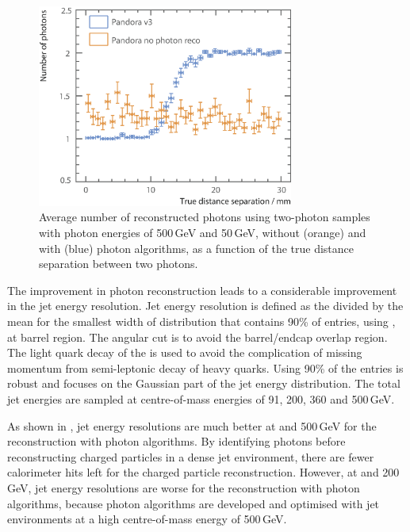 \begin{figure}[!tbph]
\centering
\includegraphics[width=0.75\textwidth]{photon/nPhotonVSnoPhotonReco3}
\caption[Average number of photons using two photons of 500 and 50\,GeV per event sample.]
{Average number of reconstructed  photons using two-photon samples with photon energies of  500\,GeV and 50\,GeV, without (orange) and with (blue) photon algorithms, as a function of the true distance separation between two photons.}
\label{fig:photonDoublePerformanceNoReco}
\end{figure}




The improvement in photon reconstruction leads to a considerable improvement in the jet energy resolution. Jet energy resolution is defined as the \rms divided by the mean for the smallest width of distribution that contains 90\% of entries, using \eeZuds, at barrel region. The angular cut is to avoid the barrel/endcap overlap region. The light quark decay of the \Zprime is used   to avoid the complication of missing momentum from semi-leptonic decay of heavy quarks. Using 90\% of the entries is robust and focuses on the Gaussian part of the jet energy distribution. The total jet energies are   sampled at centre-of-mass energies of 91, 200, 360 and 500\,GeV.

As shown in , jet energy resolutions are much better at  and 500\,GeV for the reconstruction with photon algorithms. By identifying photons before reconstructing charged particles in a dense jet environment, there are fewer calorimeter hits left for the charged particle reconstruction. However, at  and 200\,GeV, jet energy resolutions are worse  for the reconstruction with photon algorithms, because photon algorithms are developed and optimised with  jet environments at a high centre-of-mass energy of 500\,GeV.

